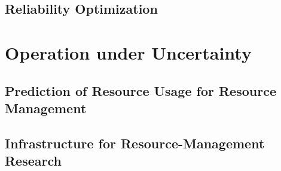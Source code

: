 \documentclass[english]{style}
\begin{document}
\section{Reliability Optimization}

\chapter{Operation under Uncertainty}
\section{Prediction of Resource Usage for Resource Management}
\section{Infrastructure for Resource-Management Research}



\printbibliography
\end{document}
